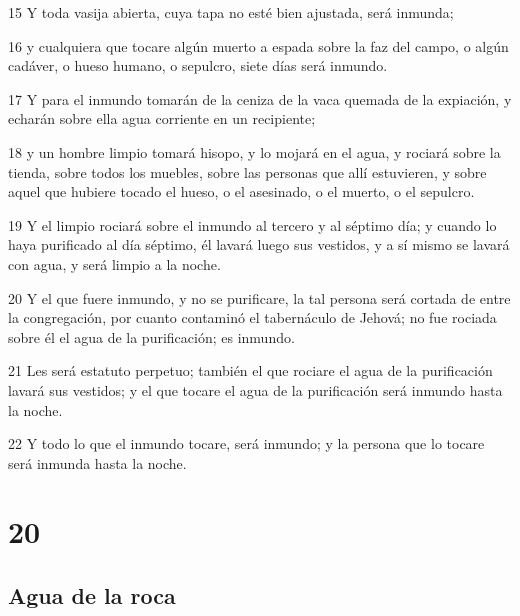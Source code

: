 \par 15 Y toda vasija abierta, cuya tapa no esté bien ajustada, será inmunda;
\par 16 y cualquiera que tocare algún muerto a espada sobre la faz del campo, o algún cadáver, o hueso humano, o sepulcro, siete días será inmundo.
\par 17 Y para el inmundo tomarán de la ceniza de la vaca quemada de la expiación, y echarán sobre ella agua corriente en un recipiente;
\par 18 y un hombre limpio tomará hisopo, y lo mojará en el agua, y rociará sobre la tienda, sobre todos los muebles, sobre las personas que allí estuvieren, y sobre aquel que hubiere tocado el hueso, o el asesinado, o el muerto, o el sepulcro.
\par 19 Y el limpio rociará sobre el inmundo al tercero y al séptimo día; y cuando lo haya purificado al día séptimo, él lavará luego sus vestidos, y a sí mismo se lavará con agua, y será limpio a la noche.
\par 20 Y el que fuere inmundo, y no se purificare, la tal persona será cortada de entre la congregación, por cuanto contaminó el tabernáculo de Jehová; no fue rociada sobre él el agua de la purificación; es inmundo.
\par 21 Les será estatuto perpetuo; también el que rociare el agua de la purificación lavará sus vestidos; y el que tocare el agua de la purificación será inmundo hasta la noche.
\par 22 Y todo lo que el inmundo tocare, será inmundo; y la persona que lo tocare será inmunda hasta la noche.

\chapter{20}

\section*{Agua de la roca}

